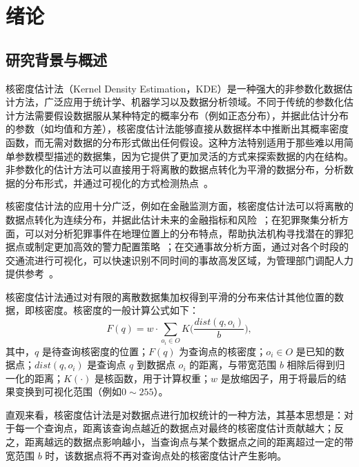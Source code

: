\chapter{绪论}

\section{研究背景与概述}

核密度估计法（Kernel Density Estimation，KDE）是一种强大的非参数化数据估计方法，广泛应用于统计学、机器学习以及数据分析领域。不同于传统的参数化估计方法需要假设数据服从某种特定的概率分布（例如正态分布），并据此估计分布的参数（如均值和方差），核密度估计法能够直接从数据样本中推断出其概率密度函数，而无需对数据的分布形式做出任何假设。这种方法特别适用于那些难以用简单参数模型描述的数据集，因为它提供了更加灵活的方式来探索数据的内在结构。
非参数化的估计方法可以直接用于将离散的数据点转化为平滑的数据分布，分析数据的分布形式，并通过可视化的方式检测热点~\cite{silverman_density_2018, gramacki_nonparametric_2018}。

核密度估计法的应用十分广泛，例如在金融监测方面，核密度估计法可以将离散的数据点转化为连续分布，并据此估计未来的金融指标和风险~\cite{diebold_multivariate_1999, diebold_evaluating_1998, harvey_kernel_2012}；在犯罪聚集分析方面，可以对分析犯罪事件在地理位置上的分布特点，帮助执法机构寻找潜在的罪犯据点或制定更加高效的警力配置策略~\cite{brunsdon_visualising_2007, nakaya_visualising_2010, hart_kernel_2014}；在交通事故分析方面，通过对各个时段的交通流进行可视化，可以快速识别不同时间的事故高发区域，为管理部门调配人力提供参考~\cite{black_highway_1991, xie_kernel_2008, plug_spatial_2011}。

核密度估计法通过对有限的离散数据集加权得到平滑的分布来估计其他位置的数据，即核密度。核密度的一般计算公式如下：
\begin{equation}
	F(q) = w \cdot \sum_{o_i \in O} {K}\Big(\frac{dist(q, o_i)}{b}\Big),
\end{equation}
其中，$q$ 是待查询核密度的位置；$F(q)$ 为查询点的核密度；$o_i \in O$ 是已知的数据点；$dist(q,o_i)$ 是查询点 $q$ 到数据点 $o_i$ 的距离，与带宽范围 $b$ 相除后得到归一化的距离；$K(\cdot)$ 是核函数，用于计算权重；$w$ 是放缩因子，用于将最后的结果变换到可视化范围（例如$0 \sim 255$）。

直观来看，核密度估计法是对数据点进行加权统计的一种方法，其基本思想是：对于每一个查询点，距离该查询点越近的数据点对最终的核密度估计贡献越大；反之，距离越远的数据点影响越小，当查询点与某个数据点之间的距离超过一定的带宽范围 $b$ 时，该数据点将不再对查询点处的核密度估计产生影响。

